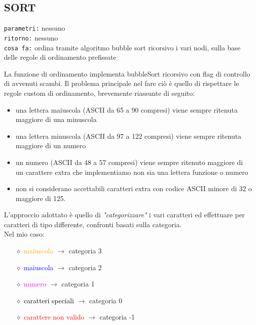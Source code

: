 \documentclass[11pt]{report}
\begin{document}
    \subsection{SORT}{
  
    
        \begin{mdframed}
            \texttt{parametri:} nessuno \\
             \texttt{ritorno:} nessuno \\
             \texttt{cosa fa:} ordina tramite algoritmo bubble sort ricorsivo i vari nodi, sulla base delle regole di ordinamento prefissate
        \end{mdframed}

    La funzione di ordinamento implementa bubbleSort ricorsivo con flag di controllo di avvenuti scambi. Il problema principale nel fare ciò è quello di rispettare le regole custom di ordinamento, brevemente riassunte di seguito:

    \small
    \begin{itemize}
        \color{orange}\item una lettera maiuscola (ASCII da 65 a 90 compresi) viene sempre ritenuta maggiore di una minuscola
        \color{blue}\item una lettera minuscola (ASCII da 97 a 122 compresi) viene sempre ritenuta maggiore di un numero
        \color{magenta}\item un numero (ASCII da 48 a 57 compresi) viene sempre ritenuto maggiore di un carattere extra che implementiamo non sia una lettera funzione o numero
        \color{black}\item non si considerano accettabili caratteri extra con codice ASCII minore di 32 o maggiore di 125.
    \end{itemize}

    L'approccio adottato è quello di \textit{"categorizzare"} i vari caratteri ed effettuare per caratteri di tipo differente, confronti basati sulla categoria.\\
    Nel mio caso:
    \begin{mdframed}
        
    \begin{itemize}
    \label{categorie}
        \item[$\diamond$] \textcolor{orange}{maiuscola} $\rightarrow$ categoria 3
        \item[$\diamond$] \textcolor{blue}{maiuscola} $\rightarrow$ categoria 2
        \item[$\diamond$] \textcolor{magenta}{numero} $\rightarrow$ categoria 1
        \item[$\diamond$] \textcolor{black}{caratteri speciali} $\rightarrow$ categoria 0
        \item[$\diamond$] \textcolor{red} {carattere non valido} $\rightarrow$ categoria -1
    \end{itemize}
    

\end{mdframed}}
\end{document}
